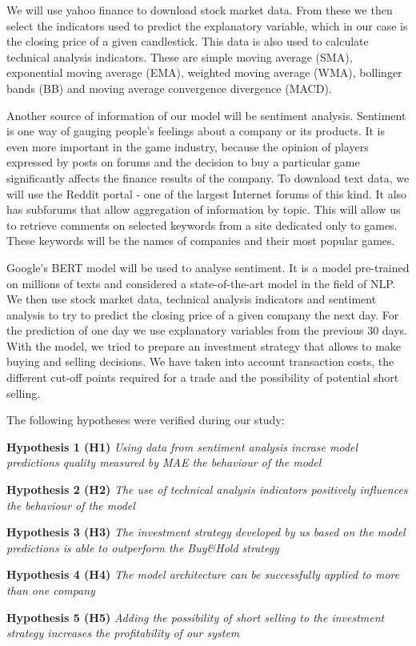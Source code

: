 \documentclass[11pt]{article} %
\begin{document}
We will use yahoo finance to download stock market data. From these we then select the indicators used to predict the explanatory variable, which in our case is the closing price of a given candlestick. This data is also used to calculate technical analysis indicators. These are simple moving average (SMA), exponential moving average (EMA), weighted moving average (WMA), bollinger bands (BB) and moving average convergence divergence (MACD). 

Another source of information of our model will be sentiment analysis. Sentiment is one way of gauging people's feelings about a company or its products. It is even more important in the game industry, because the opinion of players expressed by posts on forums and the decision to buy a particular game  significantly affects the finance results of the company. To download text data, we will use the Reddit portal - one of the largest Internet forums of this kind. It also has subforums that allow aggregation of information by topic. This will allow us to retrieve comments on selected keywords from a site dedicated only to games. These keywords will be the names of companies and their most popular games.

Google's BERT model will be used to analyse sentiment. It is a model pre-trained on millions of texts and considered a state-of-the-art model in the field of NLP. 
We then use stock market data, technical analysis indicators and sentiment analysis to try to predict the closing price of a given company the next day. For the prediction of one day we use explanatory variables from the previous 30 days. With the model, we tried to prepare an investment strategy that allows to make buying and selling decisions. We have taken into account transaction costs, the different cut-off points required for a trade and the possibility of potential short selling. 

The following hypotheses were verified during our study: 

 \begin{flushleft}\textbf{Hypothesis 1 (H1)} \textit{Using data from sentiment analysis incrase model predictions quality measured by MAE the behaviour of the model }  \end{flushleft}
 \begin{flushleft}\textbf{Hypothesis 2 (H2)} \textit{The use of technical analysis indicators positively influences the behaviour of the model } \end{flushleft}
 \begin{flushleft}\textbf{Hypothesis 3 (H3)} \textit{The investment strategy developed by us based on the model predictions is able to outperform the Buy\&Hold strategy } \end{flushleft}
 \begin{flushleft}\textbf{Hypothesis 4 (H4)} \textit{The model architecture can be successfully applied to more than one company} \end{flushleft}
 \begin{flushleft}\textbf{Hypothesis 5 (H5)} \textit{Adding the possibility of short selling to the investment strategy increases the profitability of our system} \end{flushleft}
\end{document}
